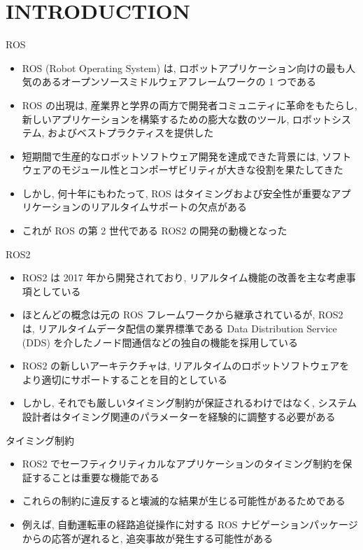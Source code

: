 
\section{INTRODUCTION}
\label{sec: introduction}

\begin{frame}{ROS}
    \begin{itemize}
        \item ROS (Robot Operating System) は, ロボットアプリケーション向けの最も人気のあるオープンソースミドルウェアフレームワークの 1 つである
        \item ROS の出現は, 産業界と学界の両方で開発者コミュニティに革命をもたらし, 新しいアプリケーションを構築するための膨大な数のツール, ロボットシステム, およびベストプラクティスを提供した
        \item 短期間で生産的なロボットソフトウェア開発を達成できた背景には, ソフトウェアのモジュール性とコンポーザビリティが大きな役割を果たしてきた
        \item しかし, 何十年にもわたって, ROS はタイミングおよび安全性が重要なアプリケーションのリアルタイムサポートの欠点がある
        \item これが ROS の第 2 世代である ROS2 の開発の動機となった
    \end{itemize}
\end{frame}

\begin{frame}{ROS2}
    \begin{itemize}
        \item ROS2 は 2017 年から開発されており, リアルタイム機能の改善を主な考慮事項としている
        \item ほとんどの概念は元の ROS フレームワークから継承されているが, ROS2 は, リアルタイムデータ配信の業界標準である Data Distribution Service (DDS) を介したノード間通信などの独自の機能を採用している
        \item ROS2 の新しいアーキテクチャは, リアルタイムのロボットソフトウェアをより適切にサポートすることを目的としている
        \item しかし, それでも厳しいタイミング制約が保証されるわけではなく, システム設計者はタイミング関連のパラメーターを経験的に調整する必要がある
    \end{itemize}
\end{frame}

\begin{frame}{タイミング制約}
    \begin{itemize}
        \item ROS2 でセーフティクリティカルなアプリケーションのタイミング制約を保証することは重要な機能である
        \item これらの制約に違反すると壊滅的な結果が生じる可能性があるためである
        \item 例えば, 自動運転車の経路追従操作に対する ROS ナビゲーションパッケージからの応答が遅れると, 追突事故が発生する可能性がある
    \end{itemize}
\end{frame}

